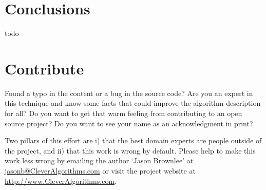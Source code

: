 \documentclass[a4paper, 11pt]{article}
\makeatletter
\newcommand{\myreportauthor}{Jason Brownlee}
\newcommand{\myreportemail}{jasonb@CleverAlgorithms.com}
\newcommand{\myreportwebsite}{http://www.CleverAlgorithms.com}
\makeatother
\begin{document}
% 
% 
\section{Conclusions}
\label{sec:conclusions}
todo


% 
% 
\section{Contribute}
\label{sec:contribute}
Found a typo in the content or a bug in the source code? 
Are you an expert in this technique and know some facts that could improve the algorithm description for all?
Do you want to get that warm feeling from contributing to an open source project? 
Do you want to see your name as an acknowledgment in print?

Two pillars of this effort are i) that the best domain experts are people outside of the project, and ii) that this work is wrong by default. 
Please help to make this work less wrong by emailing the author `\myreportauthor' at \url{\myreportemail} or visit the project website at \url{\myreportwebsite}.



\end{document}
